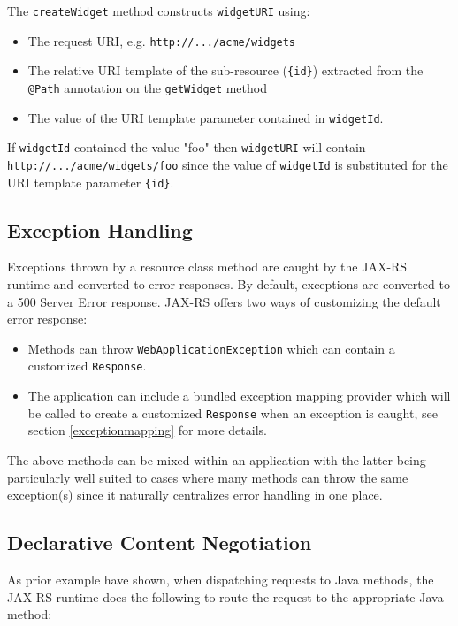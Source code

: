 \documentclass{acm_proc_article-sp}
\begin{document}
The \texttt{createWidget} method constructs \texttt{widgetURI} using:

\begin{itemize}
\item The request URI, e.g. \texttt{http://.../acme/widgets}
\item The relative URI template of the sub-resource (\texttt{\{id\}}) extracted from the \texttt{@Path} annotation on the \texttt{getWidget} method
\item The value of the URI template parameter contained in \texttt{widgetId}.
\end{itemize}

If \texttt{widgetId} contained the value "foo" then \texttt{widgetURI} will contain \texttt{http://.../acme/widgets/foo} since the value of \texttt{widgetId} is substituted for the URI template parameter \texttt{\{id\}}.

\subsection{Exception Handling}

Exceptions thrown by a resource class method are caught by the JAX-RS runtime and converted to error responses. By default, exceptions are converted to a 500 Server Error response. JAX-RS offers two ways of customizing the default error response:

\begin{itemize}
\item Methods can throw \texttt{Web\-Application\-Exception} which can contain a customized \texttt{Response}.
\item The application can include a bundled exception mapping provider which will be called to create a customized \texttt{Response} when an exception is caught, see section \ref{exceptionmapping} for more details.
\end{itemize}

The above methods can be mixed within an application with the latter being particularly well suited to cases where many methods can throw the same exception(s) since it naturally centralizes error handling in one place.

\subsection{Declarative Content Negotiation}

As prior example have shown, when dispatching requests to Java methods, the JAX-RS runtime does the following to route the request to the appropriate Java method: 
\end{document}
